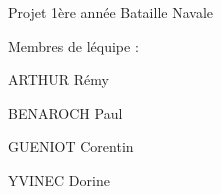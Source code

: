 Projet 1ère année Bataille Navale

Membres de l\textquotesingle{}équipe \+:
\begin{DoxyItemize}
\item A\+R\+T\+H\+UR Rémy
\item B\+E\+N\+A\+R\+O\+CH Paul
\item G\+U\+E\+N\+I\+OT Corentin
\item Y\+V\+I\+N\+EC Dorine 
\end{DoxyItemize}